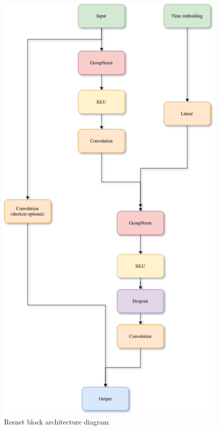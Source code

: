 \documentclass[11pt,a4paper]{report}
\begin{document}
\begin{figure}[H]
	\centering
	\includegraphics[scale=0.6]{images/ResnetBlock.drawio}
    \caption{Resnet block architecture diagram}
\end{figure}
\end{document}
